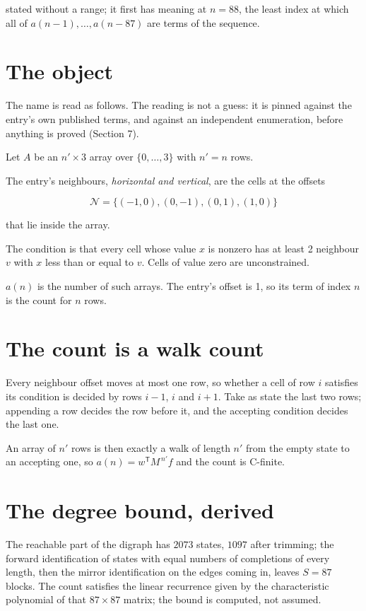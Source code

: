 \documentclass[11pt]{article}
\theoremstyle{definition}
\begin{document}
stated without a range; it first has meaning at $n = 88$, the least index at which all of $a(n-1),\dots,a(n-87)$ are terms of the sequence.

\section{The object}

The name is read as follows. The reading is not a guess: it is pinned against the entry's own published terms, and against an independent enumeration, before anything is proved (Section 7).

Let $A$ be an $n' \times 3$ array over $\{0,\dots,3\}$ with $n' = n$ rows.

The entry's neighbours, {\itshape horizontal and vertical}, are the cells at the offsets

\[\mathcal{N} = \{(-1,0), (0,-1), (0,1), (1,0)\}\]

that lie inside the array.

The condition is that every cell whose value $x$ is nonzero has at least 2 neighbour $v$ with $x$ less than or equal to $v$. Cells of value zero are unconstrained.

$a(n)$ is the number of such arrays. The entry's offset is 1, so its term of index $n$ is the count for $n$ rows.

\section{The count is a walk count}

Every neighbour offset moves at most one row, so whether a cell of row $i$ satisfies its condition is decided by rows $i-1$, $i$ and $i+1$. Take as state the last two rows; appending a row decides the row before it, and the accepting condition decides the last one.

An array of $n'$ rows is then exactly a walk of length $n'$ from the empty state to an accepting one, so $a(n) = w^{\mathsf T}M^{\,n'}f$ and the count is C-finite.

\section{The degree bound, derived}

The reachable part of the digraph has $2073$ states, $1097$ after trimming; the forward identification of states with equal numbers of completions of every length, then the mirror identification on the edges coming in, leaves $S = 87$ blocks. The count satisfies the linear recurrence given by the characteristic polynomial of that $87\times87$ matrix; the bound is computed, not assumed.
\end{document}
